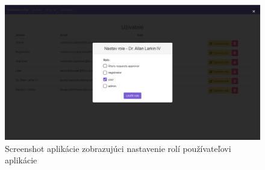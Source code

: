 \begin{figure}[H]
	\includegraphics[width=1.0\textwidth]{media/priloha/pouzivatelia/2.png}
	\caption{Screenshot aplikácie zobrazujúci nastavenie rolí používateľovi aplikácie}
\end{figure}





